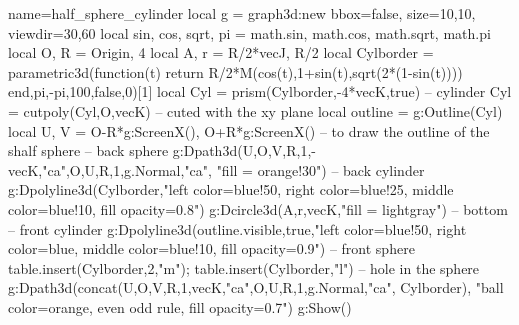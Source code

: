 \documentclass[border=2 mm]{standalone}
\begin{document}
\begin{luadraw}{name=half_sphere_cylinder}
local g = graph3d:new{ bbox=false, size={10,10}, viewdir={30,60}}
local sin, cos, sqrt, pi = math.sin, math.cos, math.sqrt, math.pi
local O, R = Origin, 4
local A, r = R/2*vecJ, R/2
local Cylborder = parametric3d(function(t) return R/2*M(cos(t),1+sin(t),sqrt(2*(1-sin(t)))) end,pi,-pi,100,false,0)[1]
local Cyl = prism(Cylborder,-4*vecK,true) -- cylinder
Cyl = cutpoly(Cyl,{O,vecK}) -- cuted with the xy plane
local outline = g:Outline(Cyl)
local U, V = O-R*g:ScreenX(), O+R*g:ScreenX() -- to draw the outline of the shalf sphere
-- back sphere
g:Dpath3d({U,O,V,R,1,-vecK,"ca",O,U,R,1,g.Normal,"ca"}, "fill = orange!30")
-- back cylinder
g:Dpolyline3d(Cylborder,"left color=blue!50, right color=blue!25, middle color=blue!10, fill opacity=0.8")
g:Dcircle3d(A,r,vecK,"fill = lightgray") -- bottom
-- front cylinder
g:Dpolyline3d(outline.visible,true,"left color=blue!50, right color=blue, middle color=blue!10, fill opacity=0.9")
-- front sphere
table.insert(Cylborder,2,"m"); table.insert(Cylborder,"l") -- hole in the sphere
g:Dpath3d(concat({U,O,V,R,1,vecK,"ca",O,U,R,1,g.Normal,"ca"}, Cylborder), "ball color=orange, even odd rule, fill opacity=0.7")
g:Show()
\end{luadraw}
\end{document}
